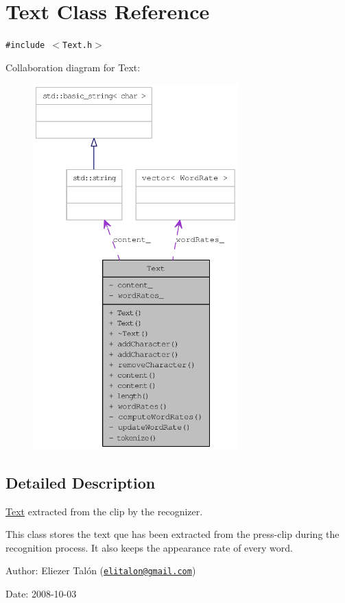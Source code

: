 \hypertarget{class_text}{
\section{Text Class Reference}
\label{class_text}
}
{\tt \#include $<$Text.h$>$}

Collaboration diagram for Text:\nopagebreak
\begin{figure}[H]
\begin{center}
\leavevmode
\includegraphics[height=400pt]{class_text__coll__graph}
\end{center}
\end{figure}


\subsection{Detailed Description}
\hyperlink{class_text}{Text} extracted from the clip by the recognizer. 

This class stores the text que has been extracted from the press-clip during the recognition process. It also keeps the appearance rate of every word.

\begin{Desc}
\item[Author:]Eliezer Talón (\href{mailto:elitalon@gmail.com}{\tt elitalon@gmail.com}) \end{Desc}
\begin{Desc}
\item[Date:]2008-10-03 \end{Desc}


